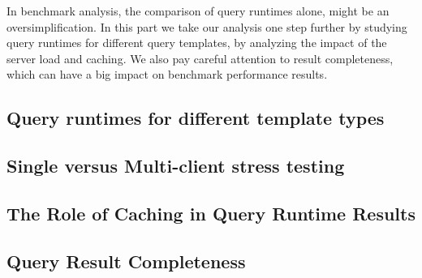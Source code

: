 
In benchmark analysis, the comparison of query runtimes alone, might be an oversimplification. 
In this part we take our analysis one step further by studying query runtimes for different query templates, by analyzing the impact of the server load and caching. We also pay careful attention to result completeness, which can have a big impact on benchmark performance results.


%
%

\subsection{Query runtimes for different template types}
\label{subsec:templates}


\subsection{Single versus Multi-client stress testing}
\label{subsec:load}


\subsection{The Role of Caching in Query Runtime Results}
\label{subsec:caching}


\subsection{Query Result Completeness}
\label{subsec:completeness}
